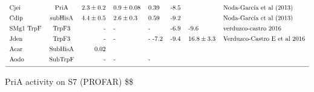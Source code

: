 \documentclass[12pt,twoside]{reedthesis}
\begin{document}
\[\begin{tabular}{ l c r l l l l l}
  Cjei        &PriA   &$  2.3 \pm 0.2 $&$0.9 \pm 0.08   $&0.39                    &-8.5       &          &Noda-García et al (2013)\\ [1ex]
  Cdip        &subHisA&$  4.4 \pm 0.5 $&$2.6 \pm 0.3      $&0.59                  &-9.2       &          &Noda-García et al (2013)\\ [1ex]
  SMg1 TrpF   &TrpF3  &   -                &-                &-                       &-6.9     &-9.6      &verduzco-castro 2016\\ [1ex]
  Jden        &TrpF3  &   -                &-                &-          -7.2         &-9.4     &$16.8\pm3.3$&    Verduzco-Castro E et al  2016\\ [1ex]
  Acar      &SubHisA& 0.02                     &                 &                        &       &          &            \\ [1ex]
  Aodo        &SubTrpF&       -              &-                  &-                     &       &          &\\ [1ex]
  \hline
  \end{tabular}
  \label{table:name}
  \]
  
  PriA activity on S7 (PROFAR) \$\$ \centering 
  
\end{document}
